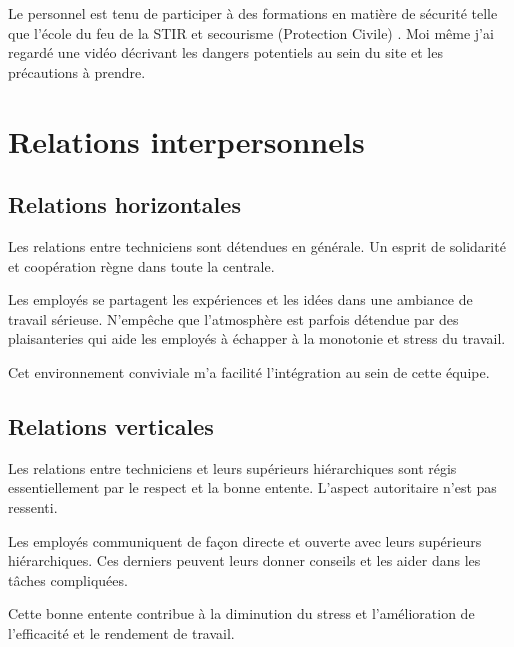 Le personnel est tenu de participer  à des formations en matière de sécurité telle que l'école du feu de la STIR et secourisme (Protection Civile) \cite{cpcwebsitefaq}. Moi même j'ai regardé une vidéo décrivant les dangers potentiels au sein du site et les précautions à prendre.


\section{Relations interpersonnels}
\subsection{Relations horizontales}
Les relations entre techniciens sont détendues en générale. Un esprit de solidarité et coopération règne dans toute la centrale. 
 
Les employés se partagent les expériences et les idées dans une ambiance de travail sérieuse. N'empêche que l'atmosphère est parfois détendue par des plaisanteries qui aide les employés   à échapper à la monotonie et stress du travail.

Cet environnement conviviale m'a facilité l'intégration au sein de cette équipe. 

\subsection{Relations verticales}
Les relations entre techniciens et leurs supérieurs hiérarchiques sont régis essentiellement  par  le respect et la bonne entente. L'aspect autoritaire n'est pas ressenti.

 Les employés communiquent de façon directe et ouverte avec leurs supérieurs hiérarchiques. Ces derniers peuvent leurs donner conseils et les aider dans les tâches compliquées. 
 
Cette bonne entente contribue à la diminution du stress et l'amélioration de l'efficacité et le rendement de travail.  
 
 